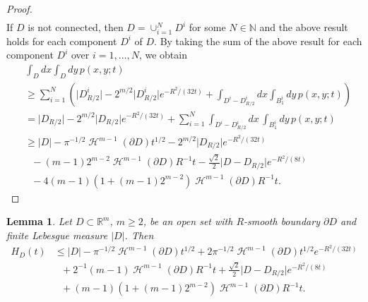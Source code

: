 \documentclass[a4paper,9pt]{amsart}
\newtheorem{lemma}[theorem]{Lemma}
\begin{document}
\begin{proof}
\begin{align*}
\end{align*}
If $D$ is not connected, then $D=\cup_{i=1}^{N} D^{i}$ for some $N
\in \mathbb{N}$ and the above result holds for each component
$D^{i}$ of $D$. By taking the sum of the above result for each
component $D^{i}$ over $i=1,\dots , N$, we obtain
\begin{align*}
&\int_{D} dx \int_{D} dy \, p(x,y;t) \nonumber \\ &\ge
\sum_{i=1}^{N} \left(\big\vert D^{i}_{R/2}\big\vert
-2^{m/2}\big\vert D^{i}_{R/2} \big\vert
e^{-R^{2}/(32t)} + \int_{D^{i}-D^{i}_{R/2}}dx \int_{B_{1}^{i}} dy \, p(x,y;t)\right)\\
&= \big\vert D_{R/2}\big\vert -2^{m/2}\big\vert D_{R/2} \big\vert
e^{-R^{2}/(32t)} +
\sum_{i=1}^{N} \int_{D^{i}-D^{i}_{R/2}} dx \, \int_{B_{1}^{i}} dy \, p(x,y;t)\\
&\geq \vert D \vert - \pi^{-1/2}\operatorname{\mathcal{H}}^{m-1}(\partial D)t^{1/2} -
2^{m/2} \big\vert D_{R/2} \big\vert e^{-R^{2}/(32t)}\nonumber \\
&\ \ \ - (m-1)2^{m-2}\operatorname{\mathcal{H}}^{m-1}(\partial D)R^{-1}t -
\frac{\sqrt{2}}{2}\big\vert D - D_{R/2} \big\vert
e^{-R^{2}/(8t)}\nonumber \\ &\ \ \ -
4(m-1)(1+(m-1)2^{m-2})\operatorname{\mathcal{H}}^{m-1}(\partial D)R^{-1}t.
\end{align*}
\end{proof}
\begin{lemma}\label{L:upperhc}
Let $D \subset \mathbb{R}^{m}$, $m \geq 2$, be an open set with $R$-smooth boundary $\partial D$ and finite Lebesgue
measure $\vert D \vert$. Then
\begin{align*}
H_{D}(t) &  \leq \vert D \vert - \pi^{-1/2}\operatorname{\mathcal{H}}^{m-1}(\partial
D)t^{1/2} + 2\pi^{-1/2}\operatorname{\mathcal{H}}^{m-1}(\partial D)t^{1/2}
e^{-R^{2}/(32t)}\nonumber \\ &\ \ \  +
2^{-1}(m-1)\operatorname{\mathcal{H}}^{m-1}(\partial D)R^{-1}t  +
\frac{\sqrt{2}}{2}\big\vert D-D_{R/2}\big\vert
e^{-R^{2}/(8t)}\nonumber \\ &\ \ \  +
(m-1)(1+(m-1)2^{m-2})\operatorname{\mathcal{H}}^{m-1}(\partial D)R^{-1}t.
\end{align*}
\end{lemma}
\end{document}
